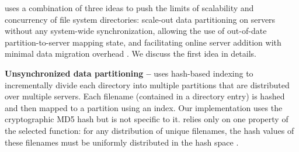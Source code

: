 \giga{} uses a combination of three ideas to push the limits of 
scalability and concurrency of file system directories: 
scale-out data partitioning on servers without any system-wide synchronization, 
allowing the use of out-of-date partition-to-server mapping state, and 
facilitating online server addition with minimal data migration overhead
\citep{GIGA}.
We discuss the first idea in details.

\textbf{Unsynchronized data partitioning -- }
\giga{} uses hash-based indexing to incrementally divide each directory into
multiple partitions that are distributed over multiple servers.
Each filename (contained in a directory entry) is hashed and then mapped to a 
partition using an index. 
Our implementation uses the cryptographic MD5 hash but is not specific
to it.
\giga{} relies only on one property of the selected function: for any 
distribution of unique filenames, the hash values of these filenames must 
be uniformly distributed in the hash space \citep{md5:rfc1321}.

